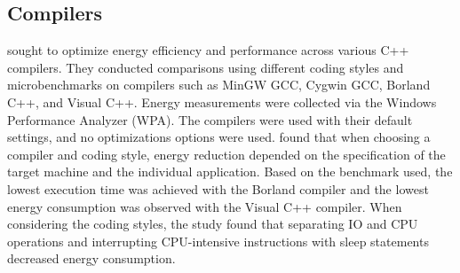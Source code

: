\subsection{Compilers}
\cite{hassan2017} sought to optimize energy efficiency and performance across various C++ compilers. They conducted comparisons using different coding styles and microbenchmarks on compilers such as MinGW GCC, Cygwin GCC, Borland C++, and Visual C++. Energy measurements were collected via the Windows Performance Analyzer (WPA). The compilers were used with their default settings, and no optimizations options were used. \cite{hassan2017} found that when choosing a compiler and coding style, energy reduction depended on the specification of the target machine and the individual application. Based on the benchmark used, the lowest execution time was achieved with the Borland compiler and the lowest energy consumption was observed with the Visual C++ compiler. When considering the coding styles, the study found that separating IO and CPU operations and interrupting CPU-intensive instructions with sleep statements decreased energy consumption.



